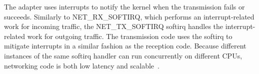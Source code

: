 The adapter uses interrupts to notify the kernel when the transmission fails or succeeds.
Similarly to NET\_RX\_SOFTIRQ, which performs an interrupt-related work for incoming traffic,
the NET\_TX\_SOFTIRQ softirq handles the interrupt-related work for outgoing traffic.
The transmission code uses the softirq to mitigate interrupts in a similar fashion as the reception code.
Because different instances of the same softirq handler can run concurrently on different CPUs,
networking code is both low latency and scalable~\cite{understanding-internals}.


